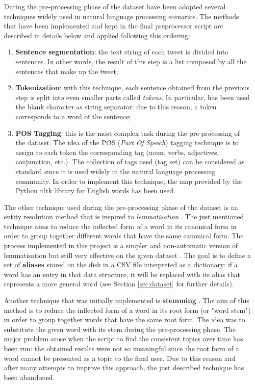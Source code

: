 During the pre-processing phase of the dataset have been adopted several techniques widely used in natural language processing scenarios. The methods that have been implemented and kept in the final preprocessor script are described in details below and applied following this ordering:
\begin{enumerate}
	\item \textbf{Sentence segmentation}: the text string of each tweet is divided into sentences. In other words, the result of this step is a list composed by all the sentences that make up the tweet;
	\item \textbf{Tokenization}: with this technique, each sentence obtained from the previous step is split into even smaller parts called \textit{tokens}. In particular, has been used the blank character as string separator: due to this reason, a token corresponds to a word of the sentence;
	\item \textbf{POS Tagging}: this is the most complex task during the pre-processing of the dataset. The idea of the POS (\textit{Part Of Speech}) tagging technique is to assign to each token the corresponding tag (noun, verbs, adjectives, conjunction, etc.). The collection of tags used (tag set) can be considered as standard since it is used widely in the natural language processing community. In order to implement this technique, the map provided by the Python nltk library \cite{python-nltk} for English words has been used.
\end{enumerate}
The other technique used during the pre-processing phase of the dataset is an entity resolution method that is inspired to \textit{lemmatisation} \cite{lemmatisation-stemming}. The just mentioned technique aims to reduce the inflected form of a word in its canonical form in order to group together different words that have the same canonical form. The process implemented in this project is a simpler and non-automatic version of lemmatisation but still very effective on the given dataset \cite{covid19-tweets-dataset}. The goal is to define a set of \textbf{aliases} stored on the disk in a CSV file interpreted as a dictionary: if a word has an entry in that data structure, it will be replaced with its alias that represents a more general word (see Section \ref{sec:dataset} for further details).

\noindent Another technique that was initially implemented is \textbf{stemming} \cite{lemmatisation-stemming}. The aim of this method is to reduce the inflected form of a word in its root form (or "word stem") in order to group together words that have the same root form. The idea was to substitute the given word with its stem during the pre-processing phase. The major problem arose when the script to find the consistent topics over time has been run: the obtained results were not so meaningful since the root form of a word cannot be presented as a topic to the final user. Due to this reason and after many attempts to improve this approach, the just described technique has been abandoned.

